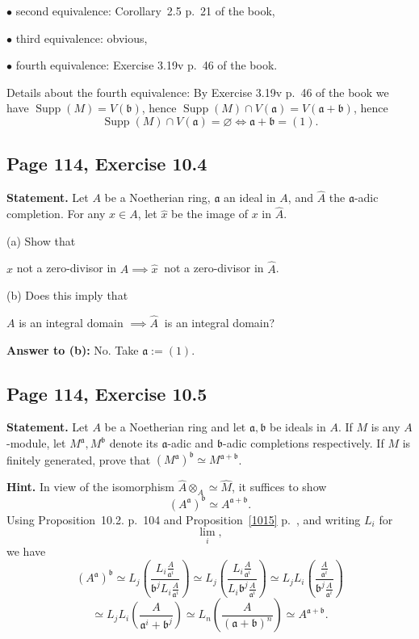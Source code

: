 \documentclass[parskip=half,fontsize=12pt]{scrartcl}%
\newcommand{\oo}{\operatorname}\newcommand{\ooo}{\operatorname*}
\newcommand{\mf}{\mathfrak}
\newcommand{\aaa}{\mf a}
\newcommand{\bbb}{\mf b}
\newcommand{\bu}{\bullet}
\begin{document}
$\bu$ second equivalence: Corollary~2.5 p.~21 of the book,

$\bu$ third equivalence: obvious,

$\bu$ fourth equivalence: Exercise 3.19v p.~46 of the book. 

Details about the fourth equivalence: By Exercise 3.19v p.~46 of the book we have $\oo{Supp}(M)=V(\bbb)$, hence $\oo{Supp}(M)\cap V(\aaa)=V(\aaa+\bbb)$, hence 
$$
\oo{Supp}(M)\cap V(\aaa)=\varnothing\iff\aaa+\bbb=(1).
$$ 

\subsection{Page 114, Exercise 10.4}%

\textbf{Statement.} Let $A$ be a Noetherian ring, $\aaa$ an ideal in $A$, and $\widehat A$ the $\aaa$-adic completion. For any $x\in A$, let $\widehat x$ be the image of $x$ in $\widehat A$. 

(a) Show that\smallskip 

\centerline{$x$ not a zero-divisor in $A\implies\widehat x\ $ not a zero-divisor in $\widehat A$.} 

(b) Does this imply that\smallskip 

\centerline{$A$ is an integral domain $\implies\widehat A\ $ is an integral domain?}

\textbf{Answer to (b):} No. Take $\aaa:=(1)$. 

\subsection{Page 114, Exercise 10.5}%

\textbf{Statement.} Let $A$ be a Noetherian ring and let $\aaa,\bbb$ be ideals in $A$. If $M$ is any $A$-module, let $M^\aaa,M^\bbb$ denote its $\aaa$-adic and $\bbb$-adic completions respectively. If $M$ is finitely generated, prove that $(M^\aaa)^\bbb\simeq M^{\aaa+\bbb}$.

\textbf{Hint.} In view of the isomorphism $\widehat A\otimes_A\simeq\widehat M$, it suffices to show 
\begin{equation}\label{aba+b}
(A^\aaa)^\bbb\simeq A^{\aaa+\bbb}. 
\end{equation} 
Using Proposition~10.2. p.~104 and Proposition~\ref{1015} p.~\pageref{1015}, and writing $L_i$ for 
$$
\lim_i,
$$ 
we have 
$$
(A^\aaa)^\bbb\simeq 
L_j\left(\frac{L_i\frac{A}{\aaa^i}}{\bbb^jL_i\frac{A}{\aaa^i}}\right)\simeq 
L_j\left(\frac{L_i\frac{A}{\aaa^i}}{L_i\bbb^j\frac{A}{\aaa^i}}\right)\simeq 
L_jL_i\left(\frac{\frac{A}{\aaa^i}}{\bbb^j\frac{A}{\aaa^i}}\right)
$$ 
$$
\simeq L_jL_i\left(\frac{A}{\aaa^i+\bbb^j}\right)
\simeq L_n\left(\frac{A}{(\aaa+\bbb)^n}\right)
\simeq A^{\aaa+\bbb}.
$$ 
\end{document}
